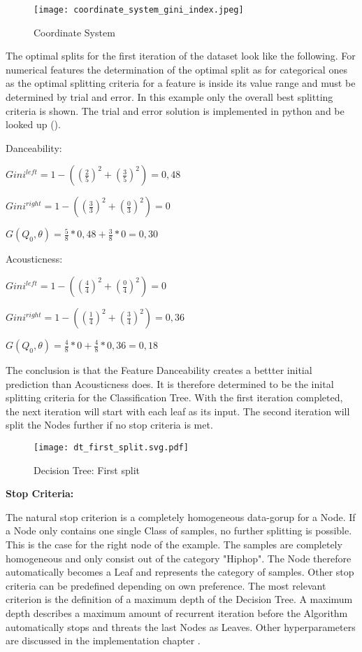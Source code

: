 \begin{figure}[H]
    \centering
    \caption[]{Coordinate System}
	\label{fig:coordinate_system_initial_dataset}
    \texttt{[image: coordinate\_system\_gini\_index.jpeg]}
\end{figure}

The optimal splits for the first iteration of the dataset look like the following. For numerical features the determination of 
the optimal split as for categorical ones as the optimal splitting criteria for a feature is inside its value 
range and must be determined by trial and error. In this example only the overall best splitting criteria is shown. 
The trial and error solution is implemented in python and be looked up (). 

Danceability: 

\(Gini^{left} = 1 - ((\frac{2}{5})^2 + (\frac{3}{5})^2) = 0,48 \)

\(Gini^{right}  = 1 - ((\frac{3}{3})^2 + (\frac{0}{3})^2) = 0 \)

\(G(Q_{0},\theta) = \frac{5}{8} * 0,48 + \frac{3}{8} * 0 = 0,30 \)

Acousticness: 

\(Gini^{left}  = 1 - ((\frac{4}{4})^2 + (\frac{0}{4})^2) = 0 \)

\(Gini^{right} = 1 - ((\frac{1}{4})^2 + (\frac{3}{4})^2) = 0,36 \)

\(G(Q_{0},\theta) = \frac{4}{8} * 0 + \frac{4}{8} * 0,36 = 0,18 \)

The conclusion is that the Feature Danceability creates a bettter initial prediction than Acousticness does. It is therefore 
determined to be the inital splitting criteria for the Classification Tree. With the first iteration completed, the next iteration
will start with each leaf as its input. The second iteration will split the Nodes further if no stop criteria is met. 

\begin{figure}[H]
    \centering
    \caption[]{Decision Tree: First split}
	\label{fig:dt_first_split}
    \texttt{[image: dt\_first\_split.svg.pdf]}
\end{figure}

\textbf{Stop Criteria:}

The natural stop criterion is a completely homogeneous data-gorup for a Node. If a Node only contains one single 
Class of samples, no further splitting is possible. This is the case for the right node of the example. The samples are completely
homogeneous and only consist out of the category "Hiphop". The Node therefore automatically becomes a Leaf and represents the 
category of samples. Other stop criteria can be predefined depending on own preference. The most relevant criterion is the 
definition of a maximum depth of the Decision Tree. A maximum depth describes a maximum amount of recurrent iteration before 
the Algorithm automatically stops and threats the last Nodes as Leaves. Other hyperparameters are discussed in the implementation 
chapter \cite[p.7]{lewis2000introduction}. 

